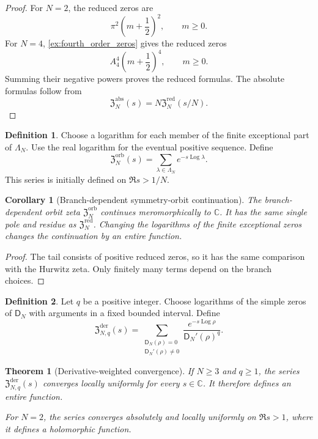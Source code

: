 \documentclass[11pt]{article}
\newtheorem{theorem}{Theorem}[section]
\newtheorem{corollary}[corollary]{Corollary}
\theoremstyle{definition}
\newtheorem{definition}[definition]{Definition}
\theoremstyle{remark}
\newcommand{\CC}{\mathbb C}
\newcommand{\Dfun}{\mathsf D}
\newcommand{\Log}{\operatorname{Log}}
\begin{document}
\begin{proof}
For $N=2$, the reduced zeros are
\[
\pi^2\left(m+\frac12\right)^2,
\qquad m\geq0.
\]
For $N=4$, \cref{ex:fourth_order_zeros} gives the reduced zeros
\[
A_4^4\left(m+\frac12\right)^4,
\qquad m\geq0.
\]
Summing their negative powers proves the reduced formulas.  The absolute formulas follow from
\[
\mathfrak Z_N^{\mathrm{abs}}(s)
=
N\mathfrak Z_N^{\mathrm{red}}(s/N).
\]
\end{proof}

\begin{definition}\label{def:branch_orbit_zeta}
Choose a logarithm for each member of the finite exceptional part of $\Lambda_N$.  Use the real logarithm for the eventual positive sequence.  Define
\[
\mathfrak Z_N^{\mathrm{orb}}(s)
=
\sum_{\lambda\in\Lambda_N}e^{-s\Log\lambda}.
\]
This series is initially defined on $\Re s>1/N$.
\end{definition}

\begin{corollary}[Branch-dependent symmetry-orbit continuation]\label{cor:branch_grouped_continuation}
The branch-dependent orbit zeta $\mathfrak Z_N^{\mathrm{orb}}$ continues meromorphically to $\CC$.  It has the same single pole and residue as $\mathfrak Z_N^{\mathrm{red}}$.  Changing the logarithms of the finite exceptional zeros changes the continuation by an entire function.
\end{corollary}

\begin{proof}
The tail consists of positive reduced zeros, so it has the same comparison with the Hurwitz zeta.  Only finitely many terms depend on the branch choices.
\end{proof}

\begin{definition}\label{def:derivative_weighted_zeta}
Let $q$ be a positive integer.  Choose logarithms of the simple zeros of $\Dfun_N$ with arguments in a fixed bounded interval.  Define
\[
\mathfrak Z_{N,q}^{\mathrm{der}}(s)
=
\sum_{\substack{\Dfun_N(\rho)=0\\ \Dfun_N'(\rho)\ne0}}
\frac{e^{-s\Log\rho}}{\Dfun_N'(\rho)^q}.
\]
\end{definition}

\begin{theorem}[Derivative-weighted convergence]\label{thm:derivative_weighted_convergence}
If $N\geq3$ and $q\geq1$, the series $\mathfrak Z_{N,q}^{\mathrm{der}}(s)$ converges locally uniformly for every $s\in\CC$.  It therefore defines an entire function.

For $N=2$, the series converges absolutely and locally uniformly on
$\Re s>1$, where it defines a holomorphic function.
\end{theorem}
\end{document}
